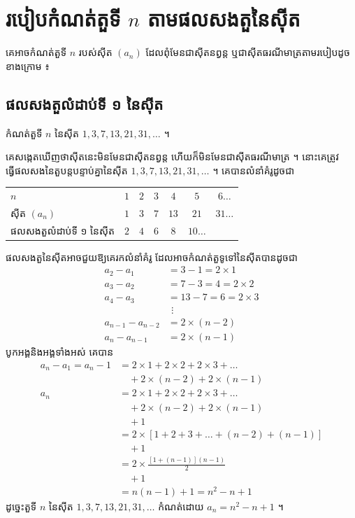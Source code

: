 \section{របៀបកំណត់តួទី \texorpdfstring{$n$}{n} តាមផលសងតួនៃស៊ីត}

គេអាចកំណត់តួទី $n$ របស់ស៊ីត $(a_n)$ ដែលពុំមែនជាស៊ីតនព្វន្ត ឬជាស៊ីតធរណីមាត្រតាមរបៀបដូចខាងក្រោម ៖

\subsection{ផលសងតួលំដាប់ទី ១ នៃស៊ីត}

\begin{example}[ឧទាហរណ៍ ១]
កំណត់តួទី $n$ នៃស៊ីត $1, 3, 7, 13, 21, 31, \ldots$ ។

គេសង្កេតឃើញថាស៊ីតនេះមិនមែនជាស៊ីតនព្វន្ត ហើយក៏មិនមែនជាស៊ីតធរណីមាត្រ ។ នោះគេត្រូវធ្វើផលសងនៃតួបន្តបន្ទាប់គ្នានៃស៊ីត $1, 3, 7, 13, 21, 31, \ldots$ ។ គេបានលំនាំគំរូដូចជា
\begin{center}
\begin{tabular}{lcccccc}
$n$ & $1$ & $2$ & $3$ & $4$ & $5$ & $6\ldots$\\
ស៊ីត $(a_n)$ & $1$ & $3$ & $7$ & $13$ & $21$ & $31\ldots$\\
ផលសងតួលំដាប់ទី ១ នៃស៊ីត & $2$ & $4$ & $6$ & $8$ & $10\ldots$ &
\end{tabular}
\end{center}
ផលសងតួនៃស៊ីតអាចជួយឱ្យគេរកលំនាំគំរូ ដែលអាចកំណត់តួទូទៅនៃស៊ីតបានដូចជា
\[
\begin{aligned}
a_2 - a_1 &= 3 - 1 = 2 \times 1\\
a_3 - a_2 &= 7 - 3 = 4 = 2 \times 2\\
a_4 - a_3 &= 13 - 7 = 6 = 2 \times 3\\
&\ \,\vdots\\
a_{n-1} - a_{n-2} &= 2 \times (n - 2)\\
a_n - a_{n-1} &= 2 \times (n - 1)
\end{aligned}
\]
បូកអង្គនិងអង្គទាំងអស់ គេបាន
\[
\begin{aligned}
a_n - a_1 = a_n - 1 &= 2 \times 1 + 2 \times 2 + 2 \times 3 + \ldots\\
&\quad + 2 \times (n - 2) + 2 \times (n - 1)\\
a_n &= 2 \times 1 + 2 \times 2 + 2 \times 3 + \ldots\\
&\quad + 2 \times (n - 2) + 2 \times (n - 1)\\
&\quad + 1\\
&= 2 \times [1 + 2 + 3 + \ldots + (n - 2) + (n - 1)]\\
&\quad + 1\\
&= 2 \times \frac{[1 + (n - 1)](n - 1)}{2}\\
&\quad + 1\\
&= n(n - 1) + 1 = n^2 - n + 1
\end{aligned}
\]
ដូច្នេះតួទី $n$ នៃស៊ីត $1, 3, 7, 13, 21, 31, \ldots$ កំណត់ដោយ $a_n = n^2 - n + 1$ ។
\end{example}

